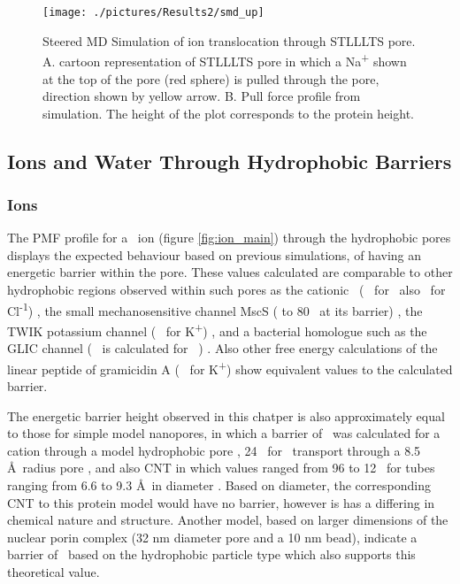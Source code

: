 \begin{figure}[H]
\begin{center}
\texttt{[image: ./pictures/Results2/smd\_up]}
\caption[Steered MD Simulation of ion translocation through STLLLTS pore.] {Steered MD Simulation of ion translocation through STLLLTS pore. A. cartoon representation of STLLLTS pore in which a Na\textsuperscript{+} shown at the top of the pore (red sphere) is pulled through the pore, direction shown by yellow arrow. B. Pull force profile from simulation. The height of the plot corresponds to the protein height.} 
\label{fig:smd_up}
\end{center}
\end{figure}


\subsection{Ions and Water Through Hydrophobic Barriers}

\subsubsection{Ions}

The PMF profile for a \Cl\ ion (figure \ref{fig:ion_main}) through the hydrophobic pores displays the expected behaviour based on previous simulations, of having an energetic barrier within the pore. These values calculated are comparable to other hydrophobic regions observed within such pores as the cationic \na\ ( \kj\ for \Na\ also   \kj\ for Cl\textsuperscript{-1}) \cite{Beckstein2006b}, the small mechanosensitive channel MscS ( to 80 \kj\ at its barrier) \cite{Anishkin2004}, the TWIK potassium channel ( \kj\ for K\textsuperscript{+}) \cite{Aryal2014g}, and a bacterial homologue such as the GLIC channel ( \kj\ is calculated for \Na\ ) \cite{Zhu2012}. Also other free energy calculations of the linear peptide of gramicidin A ( \kj\ for K\textsuperscript{+}) \cite{Allen2006} show equivalent values to the calculated barrier.

The energetic barrier height observed in this chatper is also approximately equal to those for simple model nanopores,  in which a barrier of  \kj\ was calculated for a cation through a model hydrophobic pore \cite{Beckstein2004a}, 24 \kj\ for \Cl\ transport through a 8.5 \AA\ radius pore \cite{Dzubiella2005}, and also CNT in which values ranged from 96 to 12 \kj\ for tubes ranging from 6.6 to 9.3 \AA\ in diameter \cite{Corry2008}. Based on diameter, the corresponding CNT to this protein model would have no barrier, however is has a differing in chemical nature and structure. Another model, based on larger dimensions of the nuclear porin complex (32 nm diameter pore and a 10 nm bead), indicate a barrier of  \kj\ based on the hydrophobic particle type which also supports this theoretical value. 

